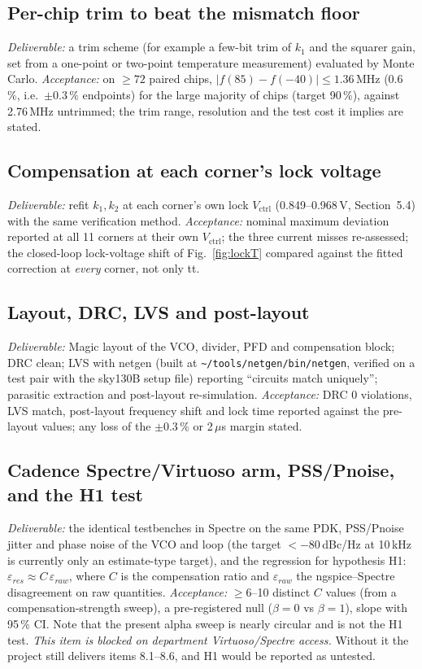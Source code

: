 \documentclass[11pt,a4paper]{article}
\newcommand{\vc}{V_{\mathrm{ctrl}}}
\begin{document}
\subsection{Per-chip trim to beat the mismatch floor}
\emph{Deliverable:} a trim scheme (for example a few-bit trim of $k_1$ and the squarer gain, set from a one-point or two-point temperature measurement) evaluated by Monte Carlo. \emph{Acceptance:} on $\ge72$ paired chips, $|f(85)-f(-40)|\le1.36$\,MHz (0.6\,\%, i.e.\ $\pm0.3\,\%$ endpoints) for the large majority of chips (target 90\,\%), against 2.76\,MHz untrimmed; the trim range, resolution and the test cost it implies are stated.

\subsection{Compensation at each corner's lock voltage}
\emph{Deliverable:} refit $k_1,k_2$ at each corner's own lock $\vc$ (0.849--0.968\,V, Section~5.4) with the same verification method. \emph{Acceptance:} nominal maximum deviation reported at all 11 corners at their own $\vc$; the three current misses re-assessed; the closed-loop lock-voltage shift of Fig.~\ref{fig:lockT} compared against the fitted correction at \emph{every} corner, not only tt.

\subsection{Layout, DRC, LVS and post-layout}
\emph{Deliverable:} Magic layout of the VCO, divider, PFD and compensation block; DRC clean; LVS with netgen (built at \texttt{\textasciitilde/tools/netgen/bin/netgen}, verified on a test pair with the sky130B setup file) reporting ``circuits match uniquely''; parasitic extraction and post-layout re-simulation. \emph{Acceptance:} DRC 0 violations, LVS match, post-layout frequency shift and lock time reported against the pre-layout values; any loss of the $\pm0.3\,\%$ or 2\,$\mu$s margin stated.

\subsection{Cadence Spectre/Virtuoso arm, PSS/Pnoise, and the H1 test}
\emph{Deliverable:} the identical testbenches in Spectre on the same PDK, PSS/Pnoise jitter and phase noise of the VCO and loop (the target $<-80$\,dBc/Hz at 10\,kHz is currently only an estimate-type target), and the regression for hypothesis H1: $\varepsilon_{res}\approx C\,\varepsilon_{raw}$, where $C$ is the compensation ratio and $\varepsilon_{raw}$ the ngspice--Spectre disagreement on raw quantities. \emph{Acceptance:} $\ge6$--10 distinct $C$ values (from a compensation-strength sweep), a pre-registered null ($\beta=0$ vs $\beta=1$), slope with 95\,\% CI. Note that the present alpha sweep is nearly circular and is not the H1 test. \emph{This item is blocked on department Virtuoso/Spectre access.} Without it the project still delivers items 8.1--8.6, and H1 would be reported as untested.
\end{document}
